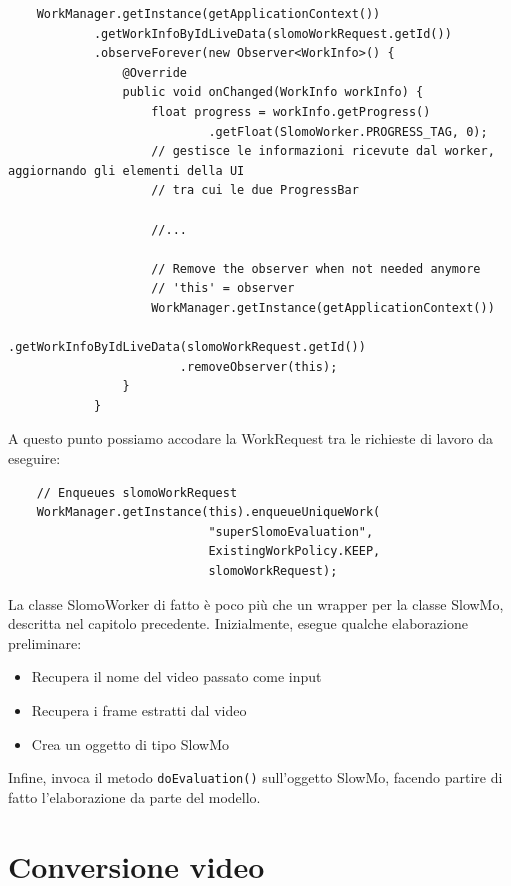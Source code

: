 \begin{lstlisting}
    WorkManager.getInstance(getApplicationContext())
            .getWorkInfoByIdLiveData(slomoWorkRequest.getId())
            .observeForever(new Observer<WorkInfo>() {
                @Override
                public void onChanged(WorkInfo workInfo) {
                    float progress = workInfo.getProgress()
                            .getFloat(SlomoWorker.PROGRESS_TAG, 0);
                    // gestisce le informazioni ricevute dal worker, aggiornando gli elementi della UI
                    // tra cui le due ProgressBar

                    //...
                    
                    // Remove the observer when not needed anymore
                    // 'this' = observer
                    WorkManager.getInstance(getApplicationContext())
                        .getWorkInfoByIdLiveData(slomoWorkRequest.getId())
                        .removeObserver(this);
                }
            }
\end{lstlisting}

A questo punto possiamo accodare la WorkRequest tra le richieste di lavoro da eseguire:

\begin{lstlisting}
    // Enqueues slomoWorkRequest
    WorkManager.getInstance(this).enqueueUniqueWork(
                            "superSlomoEvaluation",
                            ExistingWorkPolicy.KEEP,
                            slomoWorkRequest);
\end{lstlisting}

La classe SlomoWorker di fatto è poco più che un wrapper per la classe SlowMo, descritta nel capitolo precedente.
Inizialmente, esegue qualche elaborazione preliminare:
\begin{itemize}
    \item Recupera il nome del video passato come input
    \item Recupera i frame estratti dal video
    \item Crea un oggetto di tipo SlowMo
\end{itemize}

Infine, invoca il metodo \texttt{doEvaluation()} sull'oggetto SlowMo, facendo partire di fatto l'elaborazione da parte
del modello.

\section{Conversione video}

